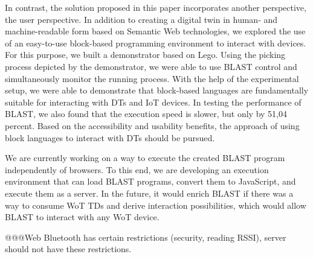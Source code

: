 \documentclass[runningheads]{llncs}
\begin{document}
In contrast, the solution proposed in this paper incorporates another perspective, the user perspective.
In addition to creating a digital twin in human- and machine-readable form based on Semantic Web technologies, we explored the use of an easy-to-use block-based programming environment to interact with devices.
For this purpose, we built a demonstrator based on Lego. Using the picking process depicted by the demonstrator, we were able to use BLAST control and simultaneously monitor the running process.
With the help of the experimental setup, we were able to demonstrate that block-based languages are fundamentally suitable for interacting with DTs and IoT devices.
In testing the performance of BLAST, we also found that the execution speed is slower, but only by 51,04 percent.
Based on the accessibility and usability benefits, the approach of using block languages to interact with DTs should be pursued.

We are currently working on a way to execute the created BLAST program independently of browsers.
To this end, we are developing an execution environment that can load BLAST programs, convert them to JavaScript, and execute them as a server.
In the future, it would enrich BLAST if there was a way to consume WoT TDs and derive interaction possibilities, which would allow BLAST to interact with any WoT device.

@@@Web Bluetooth has certain restrictions (security, reading RSSI), server should not have these restrictions.

%
%
%


%
\end{document}
